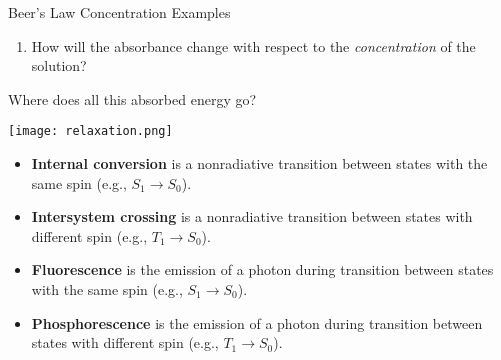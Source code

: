 \documentclass[notes=only]{beamer}
\begin{document}
\begin{frame}[t]{Beer's Law Concentration Examples}
	\begin{enumerate}
		\item How will the absorbance change with respect to the
			\emph{concentration} of the solution?
	\end{enumerate}
\end{frame}


\begin{frame}[allowframebreaks]{Where does all this absorbed energy go?}
	\begin{center}
		\texttt{[image: relaxation.png]}
	\end{center}

	\framebreak

	\begin{itemize}
		\item \textbf{Internal conversion} is a \alert{nonradiative}
			transition between states with the same spin (e.g.,
			$S_1 \rightarrow S_0$).
		\item \textbf{Intersystem crossing} is a \alert{nonradiative}
			transition between states with different spin (e.g.,
			$T_1 \rightarrow S_0$).
		\item \textbf{Fluorescence} is the \alert{emission} of a photon
			during transition between states with the same spin
			(e.g., $S_1 \rightarrow S_0$).
		\item \textbf{Phosphorescence} is the \alert{emission} of a
			photon during transition between states with different
			spin (e.g., $T_1 \rightarrow S_0$).
	\end{itemize}
\end{frame}

\end{document}
